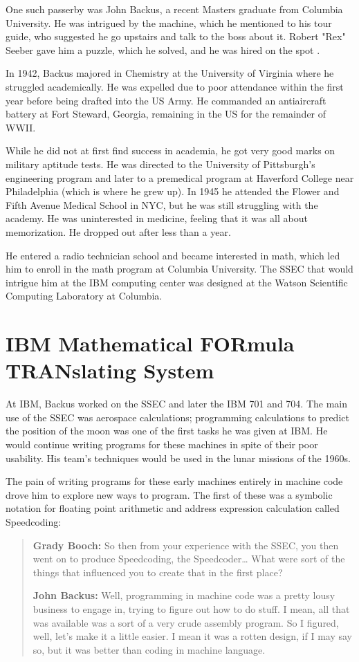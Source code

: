 One such passerby was John Backus, a recent Masters graduate from Columbia
University. He was intrigued by the machine, which he mentioned to his tour
guide, who suggested he go upstairs and talk to the boss about it. Robert "Rex"
Seeber gave him a puzzle, which he solved, and he was hired on the spot
\cite{backus_oral_history_2006}.

In 1942, Backus majored in Chemistry at the University of Virginia where he
struggled academically. He was expelled due to poor attendance within the first
year before being drafted into the US Army. He commanded an antiaircraft
battery at Fort Steward, Georgia, remaining in the US for the remainder of
WWII.

While he did not at first find success in academia, he got very good marks on
military aptitude tests. He was directed to the University of Pittsburgh's
engineering program and later to a premedical program at Haverford College near
Philadelphia (which is where he grew up). In 1945 he attended the Flower and
Fifth Avenue Medical School in NYC, but he was still struggling with the
academy. He was uninterested in medicine, feeling that it was all about
memorization. He dropped out after less than a year.

He entered a radio technician school and became interested in math, which led
him to enroll in the math program at Columbia University. The SSEC that would
intrigue him at the IBM computing center was designed at the Watson Scientific
Computing Laboratory at Columbia.

\section{IBM Mathematical FORmula TRANslating System}

At IBM, Backus worked on the SSEC and later the IBM 701 and 704. The main use
of the SSEC was aerospace calculations; programming calculations to predict the
position of the moon was one of the first tasks he was given at IBM. He would
continue writing programs for these machines in spite of their poor usability.
His team's techniques would be used in the lunar missions of the 1960s.

The pain of writing programs for these early machines entirely in machine code
drove him to explore new ways to program. The first of these was a symbolic
notation for floating point arithmetic and address expression calculation
called Speedcoding\cite{backus_oral_history_2006}:

\begin{quotation}
    \textbf{Grady Booch:}
    So then from your experience with the SSEC, you then went on to produce Speedcoding, the
    Speedcoder\dots
    What were sort of the things that influenced you to create that in the first place?

    \textbf{John Backus:}
    Well, programming in machine code was a pretty lousy business to engage in, trying to figure
    out how to do stuff. I mean, all that was available was a sort of a very crude assembly program. So I
    figured, well, let's make it a little easier. I mean it was a rotten design, if I may say so, but it was better
    than coding in machine language.
\end{quotation}

